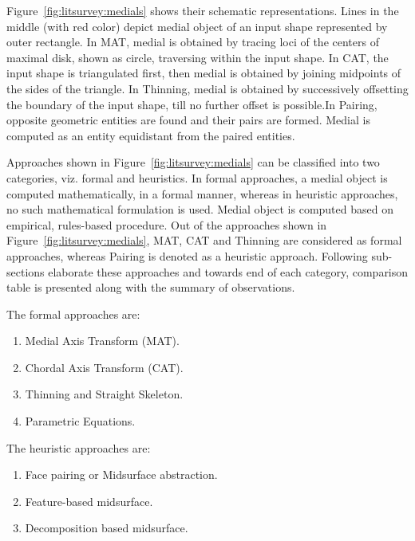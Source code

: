  
Figure~\ref{fig:litsurvey:medials} shows their schematic representations. Lines in the middle (with red color) depict medial object of an input shape represented by outer rectangle. In MAT, medial is obtained by tracing loci of the centers of maximal disk, shown as circle, traversing within the input shape. In CAT, the input shape is triangulated first, then medial is obtained by joining midpoints of the sides of the triangle. In Thinning, medial is obtained by successively offsetting the boundary of the input shape, till no further offset is possible.In Pairing, opposite geometric entities are found and their pairs are formed. Medial is computed as an entity equidistant from the paired entities.

Approaches shown in Figure~\ref{fig:litsurvey:medials} can be classified into two categories, viz. formal and heuristics. In formal approaches, a medial object is computed mathematically, in a formal manner, whereas in heuristic approaches, no such mathematical formulation is used. Medial object is computed based on empirical, rules-based procedure.
Out of the approaches shown in Figure~\ref{fig:litsurvey:medials}, MAT, CAT and Thinning are considered as formal approaches, whereas Pairing is denoted as a heuristic approach.  Following sub-sections elaborate these approaches and towards end of each category, comparison table is presented along with the summary of observations.

The formal approaches are:

\begin{enumerate}[noitemsep,topsep=2pt,parsep=2pt,partopsep=2pt]
	\item  Medial Axis Transform (MAT).
	\item Chordal  Axis Transform (CAT).
	\item Thinning and Straight Skeleton.
	\item Parametric Equations.
\end{enumerate}

The heuristic approaches are:

\begin{enumerate}[noitemsep,topsep=2pt,parsep=2pt,partopsep=2pt]
	\item Face pairing or Midsurface abstraction.
	\item Feature-based midsurface.
	\item Decomposition based midsurface.
\end{enumerate}

